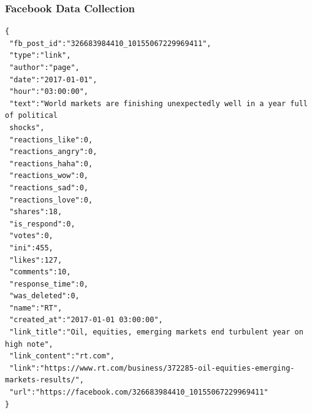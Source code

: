 \begin{frame}[fragile]
 \frametitle{Facebook Data Collection}
 \tiny
 \begin{verbatim}
{
 "fb_post_id":"326683984410_10155067229969411",
 "type":"link",
 "author":"page",
 "date":"2017-01-01",
 "hour":"03:00:00",
 "text":"World markets are finishing unexpectedly well in a year full of political
 shocks",
 "reactions_like":0,
 "reactions_angry":0,
 "reactions_haha":0,
 "reactions_wow":0,
 "reactions_sad":0,
 "reactions_love":0,
 "shares":18,
 "is_respond":0,
 "votes":0,
 "ini":455,
 "likes":127,
 "comments":10,
 "response_time":0,
 "was_deleted":0,
 "name":"RT",
 "created_at":"2017-01-01 03:00:00",
 "link_title":"Oil, equities, emerging markets end turbulent year on high note",
 "link_content":"rt.com",
 "link":"https://www.rt.com/business/372285-oil-equities-emerging-markets-results/",
 "url":"https://facebook.com/326683984410_10155067229969411"
}
 \end{verbatim}
\end{frame}
\begin{frame}
\end{frame}
